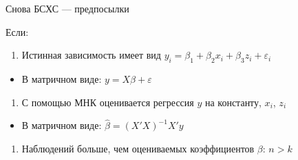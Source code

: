 \documentclass[russian,ignorenonframetext,]{beamer}
\providecommand{\tightlist}{%
  \setlength{\itemsep}{0pt}\setlength{\parskip}{0pt}}
\begin{document}
\begin{frame}{Снова БСХС --- предпосылки}

Если:

\begin{enumerate}
\def\labelenumi{\arabic{enumi}.}
\tightlist
\item
  Истинная зависимость имеет вид
  \(y_i=\beta_1 + \beta_2 x_i + \beta_3 z_i+\varepsilon_i\)
\end{enumerate}

\begin{itemize}
\tightlist
\item
  В матричном виде: \(y=X\beta + \varepsilon\)
\end{itemize}

\begin{enumerate}
\def\labelenumi{\arabic{enumi}.}
\setcounter{enumi}{1}
\tightlist
\item
  С помощью МНК оценивается регрессия \(y\) на константу, \(x_i\),
  \(z_i\)
\end{enumerate}

\begin{itemize}
\tightlist
\item
  В матричном виде: \(\hat{\beta}=(X'X)^{-1}X'y\)
\end{itemize}

\begin{enumerate}
\def\labelenumi{\arabic{enumi}.}
\setcounter{enumi}{2}
\tightlist
\item
  Наблюдений больше, чем оцениваемых коэффициентов \(\beta\): \(n>k\)
\end{enumerate}

\end{frame}
\end{document}
